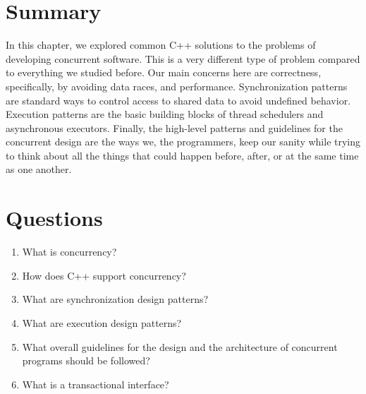 \section{Summary}

In this chapter, we explored common C++ solutions to the problems of developing concurrent software. This is a very different type of problem compared to everything we studied before. Our main concerns here are correctness, specifically, by avoiding data races, and performance. Synchronization patterns are standard ways to control access to shared data to avoid undefined behavior. Execution patterns are the basic building blocks of thread schedulers and asynchronous executors. Finally, the high-level patterns and guidelines for the concurrent design are the ways we, the programmers, keep our sanity while trying to think about all the things that could happen before, after, or at the same time as one another.

\section{Questions}

\begin{enumerate}
\item
  What is concurrency?
\item
  How does C++ support concurrency?
\item
  What are synchronization design patterns?
\item
  What are execution design patterns?
\item
  What overall guidelines for the design and the architecture of concurrent programs should be followed?
\item
  What is a transactional interface?
\end{enumerate}

